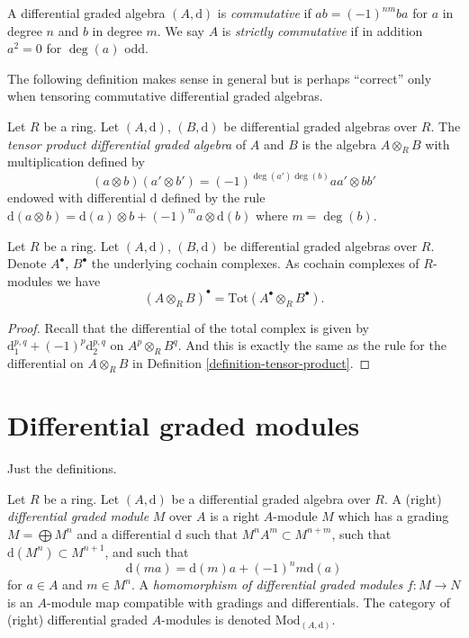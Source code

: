 \begin{definition}
\label{definition-cdga}
A differential graded algebra $(A, \text{d})$ is {\it commutative} if
$ab = (-1)^{nm}ba$ for $a$ in degree $n$ and $b$ in degree $m$.
We say $A$ is {\it strictly commutative} if in addition $a^2 = 0$
for $\deg(a)$ odd.
\end{definition}

\noindent
The following definition makes sense in general but is perhaps
``correct'' only when tensoring commutative differential graded
algebras.

\begin{definition}
\label{definition-tensor-product}
Let $R$ be a ring.
Let $(A, \text{d})$, $(B, \text{d})$ be differential graded algebras over $R$.
The {\it tensor product differential graded algebra} of $A$ and $B$
is the algebra $A \otimes_R B$ with multiplication defined by
$$
(a \otimes b)(a' \otimes b') = (-1)^{\deg(a')\deg(b)} aa' \otimes bb'
$$
endowed with differential $\text{d}$ defined by the rule
$\text{d}(a \otimes b) = \text{d}(a) \otimes b + (-1)^m a \otimes \text{d}(b)$
where $m = \deg(b)$.
\end{definition}

\begin{lemma}
\label{lemma-total-complex-tensor-product}
Let $R$ be a ring.
Let $(A, \text{d})$, $(B, \text{d})$ be differential graded algebras over $R$.
Denote $A^\bullet$, $B^\bullet$ the underlying cochain complexes.
As cochain complexes of $R$-modules we have
$$
(A \otimes_R B)^\bullet = \text{Tot}(A^\bullet \otimes_R B^\bullet).
$$
\end{lemma}

\begin{proof}
Recall that the differential of the total complex is given by
$\text{d}_1^{p, q} + (-1)^p \text{d}_2^{p, q}$ on $A^p \otimes_R B^q$.
And this is exactly the same as the rule for the differential
on $A \otimes_R B$ in
Definition \ref{definition-tensor-product}.
\end{proof}






\section{Differential graded modules}
\label{section-modules}

\noindent
Just the definitions.

\begin{definition}
\label{definition-dgm}
Let $R$ be a ring.
Let $(A, \text{d})$ be a differential graded algebra over $R$.
A (right) {\it differential graded module} $M$ over $A$ is a right $A$-module
$M$ which has a grading $M = \bigoplus M^n$ and a differential $\text{d}$
such that $M^n A^m \subset M^{n + m}$, such that
$\text{d}(M^n) \subset M^{n + 1}$, and such that
$$
\text{d}(ma) = \text{d}(m)a + (-1)^n m\text{d}(a)
$$
for $a \in A$ and $m \in M^n$. A
{\it homomorphism of differential graded modules} $f : M \to N$
is an $A$-module map compatible with gradings and differentials.
The category of (right) differential graded $A$-modules is denoted
$\text{Mod}_{(A, \text{d})}$.
\end{definition}

